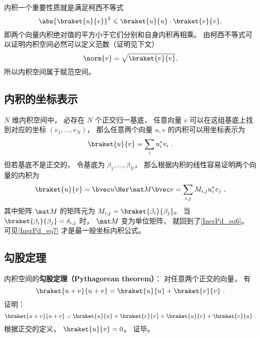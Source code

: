 内积一个重要性质就是满足柯西不等式
\begin{equation}
\abs{\braket{u}{v}}^2 \leqslant \braket{u}{u} \cdot \braket{v}{v}.
\end{equation}
即两个向量内积绝对值的平方小于它们分别和自身内积再相乘。 由柯西不等式可以证明内积空间必然可以定义范数（证明见下文）
\begin{equation}\label{InerPd_eq8}
\norm{v} = \sqrt{\braket{v}{v}},
\end{equation}
所以内积空间属于赋范空间。

\subsection{内积的坐标表示}
$N$ 维内积空间中， 必存在 $N$ 个正交归一基底， 任意向量 $v$ 可以在这组基底上找到对应的坐标 $(v_1, \dots, v_N)$， 那么任意两个向量 $u, v$ 的内积可以用坐标表示为
\begin{equation}\label{InerPd_eq6}
\braket{u}{v} = \sum_i u_i^* v_i~.
\end{equation}
但若基底不是正交的， 令基底为 $\beta_1, \dots, \beta_N$， 那么根据内积的线性容易证明两个向量的内积为
\begin{equation}\label{InerPd_eq7}
\braket{u}{v} = \bvec u\Her \mat M \bvec v = \sum_{i,j} M_{i,j} u_i^* v_j~,
\end{equation}
其中矩阵 $\mat M$ 的矩阵元为 $M_{i,j} = \braket{\beta_i}{\beta_j}$。 当 $\braket{\beta_i}{\beta_j} = \delta_{i,j}$ 时， $\mat M$ 变为单位矩阵， 就回到了\autoref{InerPd_eq6}。 可见\autoref{InerPd_eq7} 才是最一般坐标内积公式。

\subsection{勾股定理}
内积空间的\textbf{勾股定理（Pythagorean theorem）}： 对任意两个正交的向量， 有
\begin{equation}\label{InerPd_eq1}
\braket{u + v}{u + v} = \braket{u}{u} + \braket{v}{v}~.
\end{equation}
证明：
\begin{equation}
\braket{u + v}{u + v} = \braket{u}{u} + \braket{v}{v} + \braket{u}{v} + \braket{v}{u}~.
\end{equation}
根据正交的定义， $\braket{u}{v} = 0$。 证毕。

